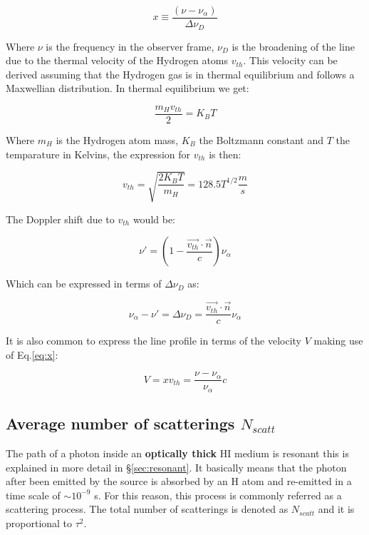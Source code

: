 \begin{equation}\label{eq:x}
x   \equiv \dfrac{(\nu -\nu_{\alpha})}{\Delta \nu_D}
\end{equation}

Where $\nu$ is the frequency in the observer frame,
$\nu_D$ is the broadening of the line due to the thermal
velocity of the Hydrogen atoms $v_{th}$. This velocity can be derived
assuming that the Hydrogen gas is in thermal equilibrium
and follows a Maxwellian distribution. In thermal equilibrium
we get:

\begin{equation}
\dfrac{m_H v_{th}}{2} = K_B T 
\end{equation}

Where $m_H$ is the Hydrogen atom mass, $K_B$ the Boltzmann constant and $T$
the temparature in Kelvins, the expression for $v_{th}$ is then:

\begin{equation}
v_{th} = \sqrt{\dfrac{2 K_B T}{m_H}} = 128.5 T^{1/2}\dfrac{m}{s}
\end{equation}

The Doppler shift due to $v_{th}$ would be:

\begin{equation}
\nu'= (1 - \dfrac{\vec{v_{th}}\cdot\vec{n}}{c})\nu_{\alpha}
\end{equation}

Which can be expressed in terms of $\Delta \nu_D$ as:

\begin{equation}
\nu_{\alpha} - \nu' = \Delta\nu_D =  \dfrac{\vec{v_{th}}\cdot\vec{n}}{c} \nu_{\alpha}
\end{equation}

It is also common to express the line profile in terms of the velocity $V$
making use of Eq.\ref{eq:x}:

\begin{equation}
V = xv_{th} = \dfrac{\nu - \nu_{\alpha}}{\nu_{\alpha}}c
\end{equation}

\subsection{Average number of scatterings $N_{scatt}$}

The path of a \ly photon inside an {\bf{optically thick}}
HI medium is resonant this is explained in more detail 
in \S \ref{sec:resonant}. It basically means that the \ly photon
after been emitted by the source is absorbed by an H atom
and re-emitted in a time scale of $\sim 10^{-9}$ s.
For this reason, this process is commonly referred as
a scattering process. The total number of scatterings
is denoted as $N_{scatt}$ and it is proportional to
$\tau^2$.



